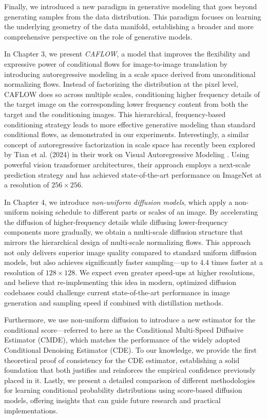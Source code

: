 Finally, we introduced a new paradigm in generative modeling that goes beyond generating samples from the data distribution. This paradigm focuses on learning the underlying geometry of the data manifold, establishing a broader and more comprehensive perspective on the role of generative models.

In Chapter 3, we present \emph{CAFLOW}, a model that improves the flexibility and expressive power of conditional flows for image-to-image translation by introducing autoregressive modeling in a scale space derived from unconditional normalizing flows. Instead of factorizing the distribution at the pixel level, CAFLOW does so across multiple scales, conditioning higher frequency details of the target image on the corresponding lower frequency content from both the target and the conditioning images. This hierarchical, frequency-based conditioning strategy leads to more effective generative modeling than standard conditional flows, as demonstrated in our experiments. Interestingly, a similar concept of autoregressive factorization in scale space has recently been explored by Tian et al. (2024) in their work on Visual Autoregressive Modeling \cite{tian2024visual}. Using powerful vision transformer architectures, their approach employs a next-scale prediction strategy and has achieved state-of-the-art performance on ImageNet at a resolution of $256\times256$.

In Chapter 4, we introduce \emph{non-uniform diffusion models}, which apply a non-uniform noising schedule to different parts or scales of an image. By accelerating the diffusion of higher-frequency details while diffusing lower-frequency components more gradually, we obtain a multi-scale diffusion structure that mirrors the hierarchical design of multi-scale normalizing flows. This approach not only delivers superior image quality compared to standard uniform diffusion models, but also achieves significantly faster sampling—up to 4.4 times faster at a resolution of $128\times128$. We expect even greater speed-ups at higher resolutions, and believe that re-implementing this idea in modern, optimized diffusion codebases could challenge current state-of-the-art performance in image generation and sampling speed if combined with distillation methods.

Furthermore, we use non-uniform diffusion to introduce a new estimator for the conditional score—referred to here as the Conditional Multi-Speed Diffusive Estimator (CMDE), which matches the performance of the widely adopted Conditional Denoising Estimator (CDE). To our knowledge, we provide the first theoretical proof of consistency for the CDE estimator, establishing a solid foundation that both justifies and reinforces the empirical confidence previously placed in it. Lastly, we present a detailed comparison of different methodologies for learning conditional probability distributions using score-based diffusion models, offering insights that can guide future research and practical implementations.

